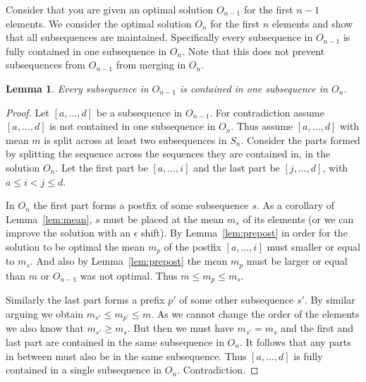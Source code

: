 \documentclass{article}
\newtheorem{lemma}{Lemma}
\begin{document}
\noindent Consider that you are given an optimal solution $O_{n-1}$ for the first $n-1$ elements.
We consider the optimal solution $O_n$ for the first $n$ elements and show that all subsequences are maintained.
Specifically every subsequence in $O_{n-1}$ is fully contained in one subsequence in $O_n$.
Note that this does not prevent subsequences from $O_{n-1}$ from merging in $O_n$.\\

\begin{lemma}
Every subsequence in $O_{n-1}$ is contained in one subsequence in $O_n$.
\end{lemma}
\begin{proof}
Let $[a,\ldots, d]$ be a subsequence in $O_{n-1}$.
For contradiction assume $[a,\ldots,d]$ is not contained in one subsequence in $O_{n}$.
Thus assume $[a,\ldots, d]$ with mean $m$ is split across at least two subsequences in $S_n$.
Consider the parts formed by splitting the sequence across the sequences they are contained in, in the solution $O_{n}$.
Let the first part be $[a, \ldots,i]$ and the last part be $[j, \ldots, d]$, with $a\le i<j \le d$.

In $O_n$ the first part forms a postfix of some subsequence $s$.
As a corollary of Lemma~\ref{lem:mean}, $s$ must be placed at the mean $m_s$ of its elements (or we can improve the solution with an $\epsilon$ shift).
By Lemma~\ref{lem:prepost} in order for the solution to be optimal the mean $m_p$ of the postfix $[a,\ldots,i]$ must smaller or equal to $m_s$.
And also by Lemma~\ref{lem:prepost} the mean $m_p$ must be larger or equal than $m$ or $O_{n-1}$ was not optimal.
Thus $m \le m_p \le m_s$.

Similarly the last part forms a prefix $p'$ of some other subsequence $s'$.
By similar arguing we obtain $m_{s'} \le m_{p'} \le m$.
As we cannot change the order of the elements we also know that $m_{s'} \ge m_s$.
But then we must have $m_{s'} = m_s$ and the first and last part are contained in the same subsequence in $O_n$.
It follows that any parts in between must also be in the same subsequence.
Thus $[a,\ldots,d]$ is fully contained in a single subsequence in $O_n$. Contradiction.
\end{proof}
\end{document}
